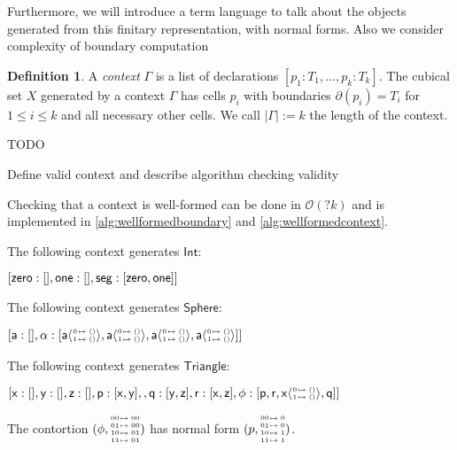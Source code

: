 \documentclass[11pt]{article}
\theoremstyle{definition}
\newtheorem{definition}{Definition}
\newcommand{\continuation}{??}
\newenvironment{examplecontd}[1]
{\renewcommand{\continuation}{\ref{#1}}\expcont[continued]}
{\endexpcont}
\newcommand{\todo}[1]{
  \begin{tcolorbox}
    TODO {#1} 
  \end{tcolorbox}
}
\newcommand{\mdef}{:=}
\newcommand{\mname}[1]{\textit{{#1}}}
\newcommand{\mlist}[1]{[ {#1} ]}
\newcommand{\ctxtdim}[1]{|{#1}|}
\newcommand{\cont}[2]{ \ifthenelse{\equal{#2}{}}{#1}{{#1}\langle{#2}\rangle} }
\newcommand{\cset}[1]{\mathsf{{#1}}}
\newcommand{\boundary}[1]{\partial({#1})}
\newcommand{\substtwo}[2]{\tiny
  \arraycolsep=.4pt\def\arraystretch{1}
  \begin{array}{ll}
    0 &\mapsto {#1} \\
    1 &\mapsto {#2}
  \end{array}
}
\newcommand{\oneconst}{\substtwo{()}{()}}
\newcommand{\oneid}{\substtwo{0}{1}}
\newcommand{\substfour}[4]{\tiny
  \arraycolsep=.4pt\def\arraystretch{1}
  \begin{array}{ll}
    00 &\mapsto {#1} \\
    01 &\mapsto {#2} \\
    10 &\mapsto {#3} \\
    11 &\mapsto {#4} 
  \end{array}
}
\begin{document}
Furthermore, we will introduce a term language to talk about the objects
generated from this finitary representation, with normal forms. Also we consider
complexity of boundary computation 


\begin{definition}
  A \mname{context} $\Gamma$ is a list of declarations $\mlist{ p_1 : T_1 ,
    \ldots , p_k : T_k}$. The cubical set $X$ generated by a context $\Gamma$
  has cells $p_i$ with boundaries $\boundary{p_i} = T_i$ for $1 \leq i \leq k$
  and all necessary other cells. We call $\ctxtdim{\Gamma} \mdef k$ the length
  of the context.
\end{definition}

\todo{Define valid context and describe algorithm checking validity

  Checking that a context is well-formed can be done in $\mathcal{O}(? k)$ and is
  implemented in \autoref{alg:wellformedboundary} and
  \autoref{alg:wellformedcontext}.
}

\begin{examplecontd}{exp:int}
  The following context generates $\cset{Int}$:
  
  $\mlist{ \cset{zero} : \mlist{} , \cset{one} : \mlist{} , \cset{seg} : \mlist{
      \cont{\cset{zero}}{}, \cont{\cset{one}}{} }}$
\end{examplecontd}

\begin{examplecontd}{exp:sndsphere}
  The following context generates $\cset{Sphere}$:

  $\mlist{ \cset{a} : \mlist{} , \cset{\alpha} : \mlist{ \cont{\cset{a}}{\oneconst} , \cont{\cset{a}}{\oneconst} ,
  \cont{\cset{a}}{\oneconst}, \cont{\cset{a}}{\oneconst} }}$
  
\end{examplecontd}

\begin{examplecontd}{exp:triangle}
  The following context generates $\cset{Triangle}$:
  

  $\mlist{ \cset{x} : \mlist{} , \cset{y} : \mlist{} , \cset{z} : \mlist{} ,
    \cset{p} : \mlist{ \cset{x}, \cset{y}  } ,
    , \cset{q} : \mlist{ \cset{y}, \cset{z} }
    , \cset{r} : \mlist{ \cset{x}, \cset{z} }
    , \cset{\phi} : \mlist{ \cset{p} , \cset{r} ,
      \cont{\cset{x}}{\oneconst}, \cset{q} }
  }$
  
  The contortion $(\phi,\substfour{00}{00}{01}{01})$ has normal form $(p,\substfour{0}{0}{1}{1})$.
\end{examplecontd}
\end{document}
